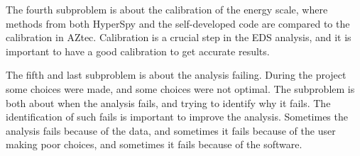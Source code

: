 \begin{center}
    \vspace*{0.2cm}

    \vspace*{0.2cm}
\end{center}




The fourth subproblem is about the calibration of the energy scale, where methods from both HyperSpy and the self-developed code are compared to the calibration in AZtec.
Calibration is a crucial step in the EDS analysis, and it is important to have a good calibration to get accurate results.

\begin{center}
    \vspace*{0.2cm}

    \vspace*{0.2cm}
\end{center}



The fifth and last subproblem is about the analysis failing.
During the project some choices were made, and some choices were not optimal.
The subproblem is both about when the analysis fails, and trying to identify why it fails.
The identification of such fails is important to improve the analysis.
Sometimes the analysis fails because of the data, and sometimes it fails because of the user making poor choices, and sometimes it fails because of the software.


\begin{center}
    \vspace*{0.2cm}

    \vspace*{0.2cm}
\end{center}






